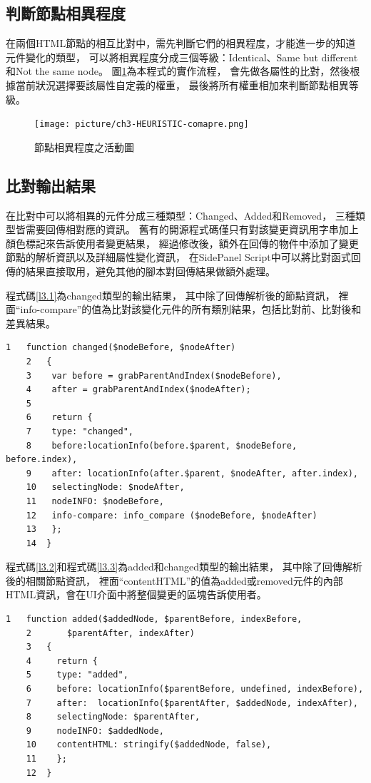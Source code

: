 \subsection{判斷節點相異程度}\label{s3.3.1}
在兩個HTML節點的相互比對中，需先判斷它們的相異程度，才能進一步的知道元件變化的類型，
可以將相異程度分成三個等級：Identical、Same but different和Not the same node。
圖\ref{f3.6}為本程式的實作流程，
會先做各屬性的比對，然後根據當前狀況選擇要該屬性自定義的權重，
最後將所有權重相加來判斷節點相異等級。

\begin{figure}[H]
    \centering
    \texttt{[image: picture/ch3-HEURISTIC-comapre.png]}
    \caption{節點相異程度之活動圖}
    \label{f3.6}
\end{figure}

\subsection{比對輸出結果}\label{s3.3.2}
在比對中可以將相異的元件分成三種類型：Changed、Added和Removed，
三種類型皆需要回傳相對應的資訊。
舊有的開源程式碼僅只有對該變更資訊用字串加上顏色標記來告訴使用者變更結果，
經過修改後，額外在回傳的物件中添加了變更節點的解析資訊以及詳細屬性變化資訊，
在SidePanel Script中可以將比對函式回傳的結果直接取用，避免其他的腳本對回傳結果做額外處理。

程式碼\ref{l3.1}為changed類型的輸出結果，
其中除了回傳解析後的節點資訊，
裡面``info-compare''的值為比對該變化元件的所有類別結果，包括比對前、比對後和差異結果。

\begin{lstlisting}[caption=比對輸出結果(changed類型), label={l3.1}]
    1   function changed($nodeBefore, $nodeAfter) 
    2   {
    3    var before = grabParentAndIndex($nodeBefore),
    4    after = grabParentAndIndex($nodeAfter);
    5
    6    return {
    7    type: "changed",
    8    before:locationInfo(before.$parent, $nodeBefore, before.index),
    9    after: locationInfo(after.$parent, $nodeAfter, after.index),
    10   selectingNode: $nodeAfter,
    11   nodeINFO: $nodeBefore,
    12   info-compare: info_compare ($nodeBefore, $nodeAfter)
    13   };
    14  }
\end{lstlisting}

程式碼\ref{l3.2}和程式碼\ref{l3.3}為added和changed類型的輸出結果，
其中除了回傳解析後的相關節點資訊，
裡面``contentHTML''的值為added或removed元件的內部HTML資訊，會在UI介面中將整個變更的區塊告訴使用者。

\begin{lstlisting}[caption=比對輸出結果(added類型), label={l3.2}]
    1   function added($addedNode, $parentBefore, indexBefore, 
    2       $parentAfter, indexAfter) 
    3   {
    4     return {
    5     type: "added",
    6     before: locationInfo($parentBefore, undefined, indexBefore),
    7     after:  locationInfo($parentAfter, $addedNode, indexAfter),
    8     selectingNode: $parentAfter,
    9     nodeINFO: $addedNode,
    10    contentHTML: stringify($addedNode, false),
    11    };
    12  }
\end{lstlisting}


